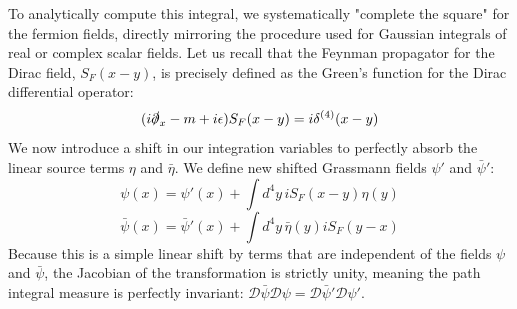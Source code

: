 To analytically compute this integral, we systematically "complete the square" for the fermion fields, directly mirroring the procedure used for Gaussian integrals of real or complex scalar fields.
Let us recall that the Feynman propagator for the Dirac field, $S_F(x-y)$, is precisely defined as the Green's function for the Dirac differential operator:
\[
    (i\slashed{\partial}_x - m + i\epsilon) S_F(x-y) = i \delta^{(4)}(x-y)
\]
We now introduce a shift in our integration variables to perfectly absorb the linear source terms $\eta$ and $\bar{\eta}$. We define new shifted Grassmann fields $\psi'$ and $\bar{\psi}'$:
\[
    \psi(x) = \psi'(x) + \int d^4y \, i S_F(x-y) \eta(y)
\]
\[
    \bar{\psi}(x) = \bar{\psi}'(x) + \int d^4y \, \bar{\eta}(y) i S_F(y-x)
\]
Because this is a simple linear shift by terms that are independent of the fields $\psi$ and $\bar{\psi}$, the Jacobian of the transformation is strictly unity, meaning the path integral measure is perfectly invariant: $\mathcal{D}\bar{\psi}\mathcal{D}\psi = \mathcal{D}\bar{\psi}'\mathcal{D}\psi'$.

